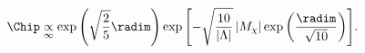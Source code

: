 \begin{equation}
\Chip \underset{\infty}{\propto} \exp{\left(\sqrt{\frac{2}{5}}\radim
\right)} \exp{\left[- \sqrt{\frac{10}{|\Lambda|}} \left|M_\chi\right|
\exp{\left(\frac{\radim}{\sqrt{10}}\right)} \right]}.
\end{equation}

